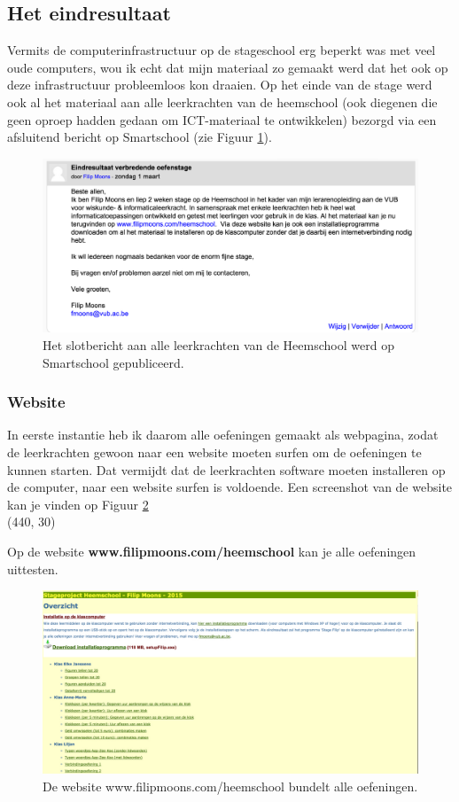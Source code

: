 \documentclass[a4paper,11pt]{article}
\theoremstyle{definition}
\begin{document}
\begin{itemize}
\begin{itemize}
\subsection{Het eindresultaat}
Vermits de computerinfrastructuur op de stageschool erg beperkt was met veel oude computers, wou ik echt dat mijn materiaal 
zo gemaakt werd dat het ook op deze infrastructuur probleemloos kon draaien. Op 
het einde van de stage werd ook al het materiaal aan alle leerkrachten van de 
heemschool (ook diegenen die geen oproep hadden gedaan om ICT-materiaal te ontwikkelen) 
bezorgd via een afsluitend bericht op Smartschool (zie Figuur \ref{einde}).
\begin{figure}
  \centering
  \includegraphics[scale=0.27]{eindoproep.jpg}\caption{Het slotbericht aan alle leerkrachten van de Heemschool werd op Smartschool gepubliceerd.}\label{einde}
\end{figure}

\subsubsection{Website}
In eerste instantie heb ik daarom alle oefeningen gemaakt als webpagina, zodat de leerkrachten 
gewoon naar een website moeten surfen om de oefeningen te kunnen starten. Dat 
vermijdt dat de leerkrachten software moeten installeren op de computer, naar 
een website surfen is voldoende. Een screenshot van de website kan je vinden op Figuur \ref{website}\\

\noindent\framebox(440, 30){ 
\parbox{430\unitlength}{\centering Op de website \textbf{www.filipmoons.com/heemschool} kan je alle oefeningen uittesten.}
}

 \begin{figure}[h!]
  \centering
  \includegraphics[scale=0.25]{website.jpg}\caption{De website www.filipmoons.com/heemschool bundelt alle oefeningen.}\label{website}
\end{figure}

\end{itemize}
\end{itemize}
\end{document}
